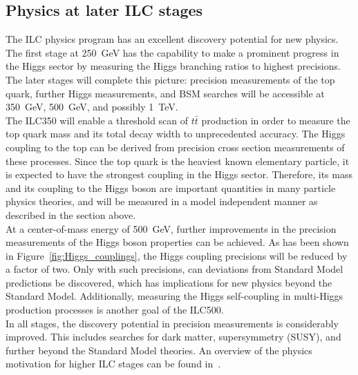 \subsection{Physics at later ILC stages}
The ILC physics program has an excellent discovery potential for new physics.
The first stage at \SI{250}{\GeV} has the capability to make a prominent progress in the Higgs sector by measuring the Higgs branching ratios to highest precisions.
The later stages will complete this picture: 
precision measurements of the top quark, further Higgs measurements, and BSM searches will be accessible at \SI{350}{\GeV}, \SI{500}{\GeV}, and possibly \SI{1}{\TeV}.
\\The ILC350 will enable a threshold scan of $t\bar{t}$ production in order to measure the top quark mass and its total decay width to unprecedented accuracy.
The Higgs coupling to the top can be derived from precision cross section measurements of these processes.
Since the top quark is the heaviest known elementary particle, it is expected to have the strongest coupling in the Higgs sector.
Therefore, its mass and its coupling to the Higgs boson are important quantities in many particle physics theories, and will be measured in a model independent manner as described in the section above.
\\At a center-of-mass energy of \SI{500}{\GeV}, further improvements in the precision measurements of the Higgs boson properties can be achieved.
As has been shown in Figure~\ref{fig:Higgs_couplings}, the Higgs coupling precisions will be reduced by a factor of two.
Only with such precisions, can deviations from Standard Model predictions be discovered, which has implications for new physics beyond the Standard Model.
Additionally, measuring the Higgs self-coupling in multi-Higgs production processes is another goal of the ILC500.
\\In all stages, the discovery potential in precision measurements is considerably improved.
This includes searches for dark matter, supersymmetry (SUSY), and further beyond the Standard Model theories.
An overview of the physics motivation for higher ILC stages can be found in~\cite{PhysicsCase}.

